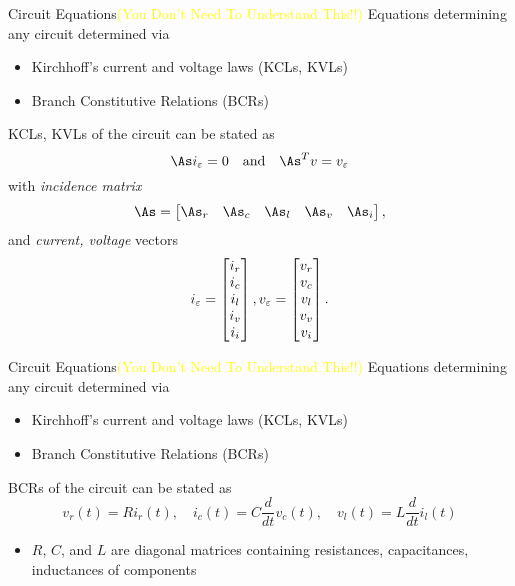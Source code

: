 \documentclass{beamer}
\begin{document}
\begin{frame}{Circuit Equations}{\textcolor{yellow}{(You Don't Need To Understand This!!)}}
Equations determining any circuit determined via
\smallskip

\begin{itemize}
 \item Kirchhoff's current and voltage laws (KCLs, KVLs)
 \item Branch Constitutive Relations (BCRs)
\end{itemize}

\smallskip
KCLs, KVLs of the circuit can be stated as
\begin{equation*}
\As i_\varepsilon = 0 \quad \text{and} \quad \As^T v = v_\varepsilon
\end{equation*}
with \emph{incidence matrix}
\begin{equation*}
\As = \mat{\As_r & \As_c & \As_l & \As_v & \As_i}, 
\end{equation*}
and \emph{current, voltage} vectors
\[
i_\varepsilon = \begin{bmatrix} i_r\\i_c\\i_l\\i_v\\i_i\end{bmatrix}, v_\varepsilon = \begin{bmatrix} v_r\\v_c\\v_l\\v_v\\v_i\end{bmatrix}.
\]  

\end{frame}

\begin{frame}{Circuit Equations}{\textcolor{yellow}{(You Don't Need To Understand This!!)}}
Equations determining any circuit determined via
\smallskip

\begin{itemize}
 \item Kirchhoff's current and voltage laws (KCLs, KVLs)
 \item Branch Constitutive Relations (BCRs)
\end{itemize}

\smallskip
BCRs of the circuit can be stated as
\[
v_r(t) = Ri_r(t),\quad i_c(t)=C\frac{d}{dt}v_c(t),\quad v_l(t)=L\frac{d}{dt}i_l(t)
\]  

\begin{itemize}
 \item $R$, $C$, and $L$ are diagonal matrices containing resistances, capacitances, 
inductances of components 
\end{itemize} 
\end{frame}
\end{document}
